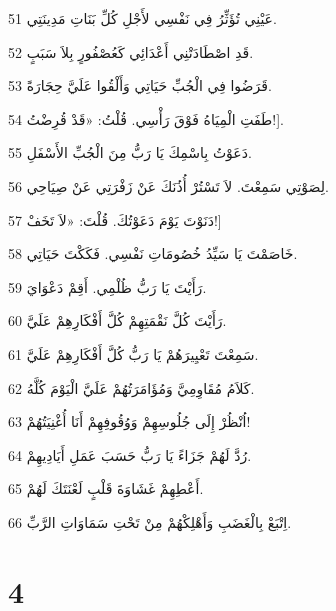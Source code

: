 \par 51 عَيْنِي تُؤَثِّرُ فِي نَفْسِي لأَجْلِ كُلِّ بَنَاتِ مَدِينَتِي.
\par 52 قَدِ اصْطَادَتْنِي أَعْدَائِي كَعُصْفُورٍ بِلاَ سَبَبٍ.
\par 53 قَرَضُوا فِي الْجُبِّ حَيَاتِي وَأَلْقُوا عَلَيَّ حِجَارَةً.
\par 54 طَفَتِ الْمِيَاهُ فَوْقَ رَأْسِي. قُلْتُ: «قَدْ قُرِضْتُ!].
\par 55 دَعَوْتُ بِاسْمِكَ يَا رَبُّ مِنَ الْجُبِّ الأَسْفَلِ.
\par 56 لِصَوْتِي سَمِعْتَ. لاَ تَسْتُرْ أُذُنَكَ عَنْ زَفْرَتِي عَنْ صِيَاحِي.
\par 57 دَنَوْتَ يَوْمَ دَعَوْتُكَ. قُلْتَ: «لاَ تَخَفْ!]
\par 58 خَاصَمْتَ يَا سَيِّدُ خُصُومَاتِ نَفْسِي. فَكَكْتَ حَيَاتِي.
\par 59 رَأَيْتَ يَا رَبُّ ظُلْمِي. أَقِمْ دَعْوَايَ.
\par 60 رَأَيْتَ كُلَّ نَقْمَتِهِمْ كُلَّ أَفْكَارِهِمْ عَلَيَّ.
\par 61 سَمِعْتَ تَعْيِيرَهُمْ يَا رَبُّ كُلَّ أَفْكَارِهِمْ عَلَيَّ.
\par 62 كَلاَمُ مُقَاوِمِيَّ وَمُؤَامَرَتُهُمْ عَلَيَّ الْيَوْمَ كُلَّهُ.
\par 63 اُنْظُرْ إِلَى جُلُوسِهِمْ وَوُقُوفِهِمْ أَنَا أُغْنِيَتُهُمْ!
\par 64 رُدَّ لَهُمْ جَزَاءً يَا رَبُّ حَسَبَ عَمَلِ أَيَادِيهِمْ.
\par 65 أَعْطِهِمْ غَشَاوَةَ قَلْبٍ لَعْنَتَكَ لَهُمْ.
\par 66 اِتْبَعْ بِالْغَضَبِ وَأَهْلِكْهُمْ مِنْ تَحْتِ سَمَاوَاتِ الرَّبِّ.

\chapter{4}

